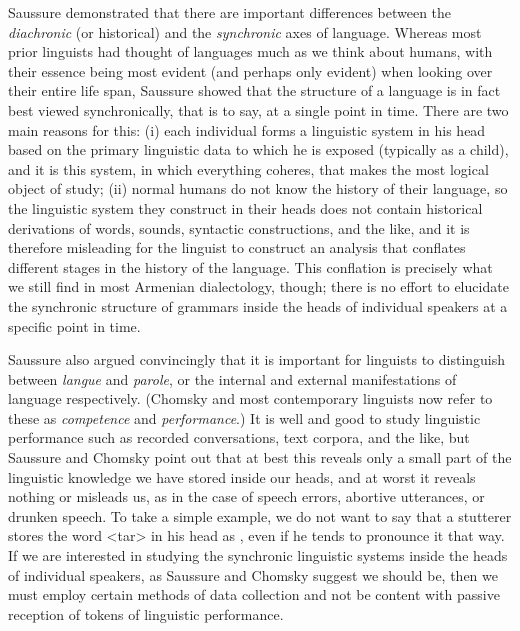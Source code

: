 Saussure demonstrated that there are important differences between the \textit{diachronic} (or historical) and the \textit{synchronic} axes of language. Whereas most prior linguists had thought of languages much as we think about humans, with their essence being most evident (and perhaps only evident) when looking over their entire life span, Saussure showed that the structure of a language is in fact best viewed synchronically, that is to say, at a single point in time. There are two main reasons for this: (i) each individual forms a linguistic system in his head based on the primary linguistic data to which he is exposed (typically as a child), and it is this system, in which everything coheres, that makes the most logical object of study; (ii) normal humans do not know the history of their language, so the linguistic system they construct in their heads does not contain historical derivations of words, sounds, syntactic constructions, and the like, and it is therefore misleading for the linguist to construct an analysis that conflates different stages in the history of the language. This conflation is precisely what we still find in most Armenian dialectology, though; there is no effort to elucidate the synchronic structure of grammars inside the heads of individual speakers at a specific point in time.

Saussure also argued convincingly that it is important for linguists to distinguish between \textit{langue} and \textit{parole}, or the internal and external manifestations of language respectively. (Chomsky and most contemporary linguists now refer to these as \textit{competence} and \textit{performance}.) It is well and good to study linguistic performance such as recorded conversations, text corpora, and the like, but Saussure and Chomsky point out that at best this reveals only a small part of the linguistic knowledge we have stored inside our heads, and at worst it reveals nothing or misleads us, as in the case of speech errors, abortive utterances, or drunken speech. To take a simple example, we do not want to say that a stutterer stores the word <tar> in his head as , even if he tends to pronounce it that way.  If we are interested in studying the synchronic linguistic systems inside the heads of individual speakers, as Saussure and Chomsky suggest we should be, then we must employ certain methods of data collection and not be content with passive reception of tokens of linguistic performance.



